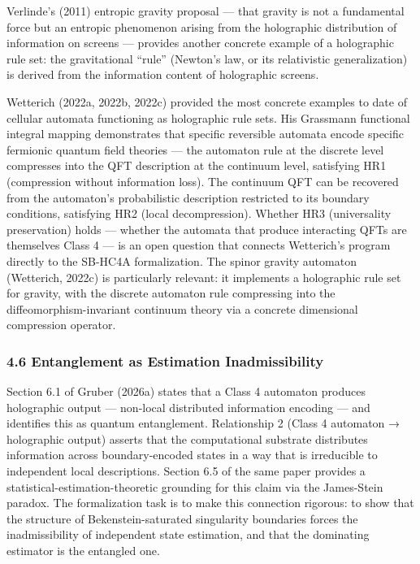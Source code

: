 \documentclass[
]{article}
\begin{document}
Verlinde's (2011) entropic gravity proposal --- that gravity is not a
fundamental force but an entropic phenomenon arising from the
holographic distribution of information on screens --- provides another
concrete example of a holographic rule set: the gravitational ``rule''
(Newton's law, or its relativistic generalization) is derived from the
information content of holographic screens.

Wetterich (2022a, 2022b, 2022c) provided the most concrete examples to
date of cellular automata functioning as holographic rule sets. His
Grassmann functional integral mapping demonstrates that specific
reversible automata encode specific fermionic quantum field theories ---
the automaton rule at the discrete level compresses into the QFT
description at the continuum level, satisfying HR1 (compression without
information loss). The continuum QFT can be recovered from the
automaton's probabilistic description restricted to its boundary
conditions, satisfying HR2 (local decompression). Whether HR3
(universality preservation) holds --- whether the automata that produce
interacting QFTs are themselves Class 4 --- is an open question that
connects Wetterich's program directly to the SB-HC4A formalization. The
spinor gravity automaton (Wetterich, 2022c) is particularly relevant: it
implements a holographic rule set for gravity, with the discrete
automaton rule compressing into the diffeomorphism-invariant continuum
theory via a concrete dimensional compression operator.

\hypertarget{entanglement-as-estimation-inadmissibility}{%
\subsubsection{4.6 Entanglement as Estimation
Inadmissibility}\label{entanglement-as-estimation-inadmissibility}}

Section 6.1 of Gruber (2026a) states that a Class 4 automaton produces
holographic output --- non-local distributed information encoding ---
and identifies this as quantum entanglement. Relationship 2 (Class 4
automaton → holographic output) asserts that the computational substrate
distributes information across boundary-encoded states in a way that is
irreducible to independent local descriptions. Section 6.5 of the same
paper provides a statistical-estimation-theoretic grounding for this
claim via the James-Stein paradox. The formalization task is to make
this connection rigorous: to show that the structure of
Bekenstein-saturated singularity boundaries forces the inadmissibility
of independent state estimation, and that the dominating estimator is
the entangled one.
\end{document}

